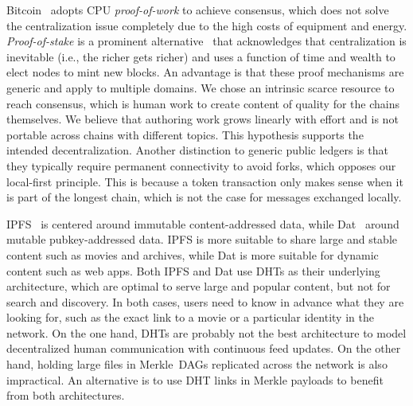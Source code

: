 \documentclass[10pt,journal,compsoc]{IEEEtran}
\begin{document}
Bitcoin~\cite{p2p.bitcoin} adopts CPU \emph{proof-of-work} to achieve consensus, which does not
solve the centralization issue completely due to the high costs of equipment
and energy.
\emph{Proof-of-stake} is a prominent alternative~\cite{p2p.proofs} that
acknowledges that centralization is inevitable (i.e., the richer gets richer)
and uses a function of time and wealth to elect nodes to mint new blocks.
An advantage is that these proof mechanisms are generic and apply to multiple
domains.
%
We chose an intrinsic scarce resource to reach consensus, which is human work
to create content of quality for the chains themselves.
We believe that authoring work grows linearly with effort and is not portable
across chains with different topics.
This hypothesis supports the intended decentralization.
%
Another distinction to generic public ledgers is that they typically require
permanent connectivity to avoid forks, which opposes our local-first principle.
This is because a token transaction only makes sense when it is part of the
longest chain, which is not the case for messages exchanged locally.

IPFS~\cite{p2p.ipfs} is centered around immutable content-addressed data, while
Dat~\cite{p2p.dat} around mutable pubkey-addressed data.
IPFS is more suitable to share large and stable content such as movies and
archives, while Dat is more suitable for dynamic content such as web apps.
%
Both IPFS and Dat use DHTs as their underlying architecture, which are optimal
to serve large and popular content, but not for search and discovery.
In both cases, users need to know in advance what they are looking for, such as
the exact link to a movie or a particular identity in the network.
%
On the one hand, DHTs are probably not the best architecture to model
decentralized human communication with continuous feed updates.
On the other hand, holding large files in Merkle~DAGs replicated across the
network is also impractical.
An alternative is to use DHT links in Merkle payloads to benefit from both
architectures.
\end{document}
